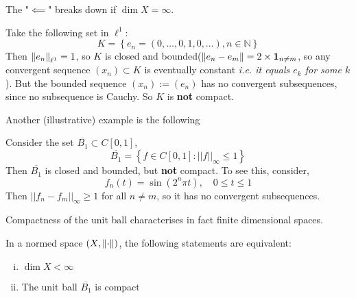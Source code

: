 \documentclass{article}
\begin{document}
The "$\impliedby$" breaks down if $\dim X = \infty$.

\begin{example}
    Take the following set in $\ell^1$:  
    \begin{equation*}
        K = \left\{ e_n = (0, \ldots, 0, 1, 0, \ldots), n \in \mathbb{N} \right\}
    \end{equation*}  
    Then $\left\|{e_n}\right\|_{\ell^1}=1$, so $K$ is closed and bounded($\left\|{e_n-e_m}\right\| = 2 \times \mathbf{1}_{n\neq m}$, so any convergent sequence $(x_n) \subset K$ is eventually constant \textit{i.e. it equals $e_k$ for some $k$}). But the bounded sequence $(x_n) := (e_n)$ has no convergent subsequences, since no subsequence is Cauchy. So $K$ is \textbf{not} compact.
\end{example}  

Another (illustrative) example is the following  

\begin{example}
    Consider the set $\overline{B_1} \subset C[0,1]$,  
    \begin{equation*}
        \overline{B_1} = \left\{ f \in C[0,1] : ||f||_{\infty} \leq 1 \right\}
    \end{equation*}  
    Then $\overline{B_1}$ is closed and bounded, but \textbf{not} compact. To see this,
    consider,  
    \begin{equation*}
        f_n(t) = \sin(2^n \pi t), \quad 0 \leq t \leq 1
    \end{equation*}  
    Then $||f_n-f_m||_{\infty}\geq 1$ for all $n \neq m$, so it has no convergent subsequences. 
\end{example}

Compactness of the unit ball characterises in fact finite dimensional spaces.  

\begin{theorem}\nextline
\label{thm: unit ball not compact in infty dim}
    In a normed space $(X, \left\|{\cdot}\right\|)$, the following statements are equivalent:  
    \begin{enumerate}[i)]
        \item $\dim X < \infty$
        \item The unit ball $\overline{B_1}$ is compact 
    \end{enumerate}
\end{theorem}  
\end{document}
